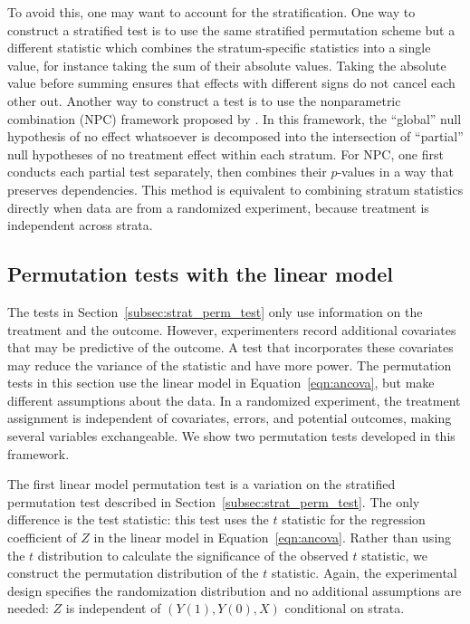 \documentclass[12pt]{article}
\begin{document}
To avoid this, one may want to account for the stratification. 
One way to construct a stratified test is to use the same stratified permutation scheme but a different statistic which combines the stratum-specific statistics into a single value, for instance taking the sum of their absolute values.
Taking the absolute value before summing ensures that effects with different signs do not cancel each other out.
Another way to construct a test is to use the nonparametric combination (NPC) framework proposed by \citet{pesarin_permutation_2010}.
In this framework, the ``global'' null hypothesis of no effect whatsoever is decomposed into the intersection of ``partial'' null hypotheses of no treatment effect within each stratum.
For NPC, one first conducts each partial test separately, then combines their $p$-values in a way that preserves dependencies.
This method is equivalent to combining stratum statistics directly when data are from a randomized experiment, because treatment is independent across strata.


\subsection{Permutation tests with the linear model}\label{subsec:lm_perm_tests}
The tests in Section~\ref{subsec:strat_perm_test} only use information on the treatment and the outcome.
However, experimenters record additional covariates that may be predictive of the outcome.
A test that incorporates these covariates may reduce the variance of the statistic and have more power.
The permutation tests in this section use the linear model in Equation~\ref{eqn:ancova}, but make different assumptions about the data.
In a randomized experiment, the treatment assignment is independent of covariates, errors, and potential outcomes,
making several variables exchangeable.
We show two permutation tests developed in this framework.

The first linear model permutation test is a variation on the stratified permutation test described in Section~\ref{subsec:strat_perm_test}.
The only difference is the test statistic:
this test uses the $t$ statistic for the regression coefficient of $Z$ in the linear model in Equation~\ref{eqn:ancova}.
Rather than using the $t$ distribution to calculate the significance of the observed $t$ statistic, we construct the permutation distribution of the $t$ statistic.
Again, the experimental design specifies the randomization distribution and no additional assumptions are needed:
$Z$ is independent of $(Y(1), Y(0), X)$ conditional on strata.
\end{document}
